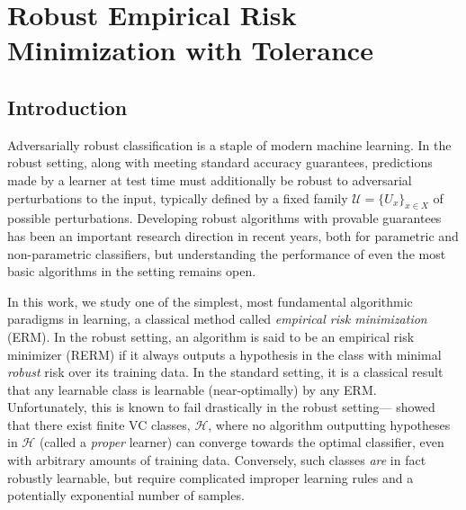 \def\ind{\mathbbm{1}}
\def\oc{Online\_Cluster}
\def\ocns{No\_Sub\_Cluster}
\def\mem{\mathcal M}
\def\E{\mathbb{E}}
\def\R{\mathbb{R}}
\def\OC{\text{OC}}
\def\cH{\mathcal H}
\def\reals{\mathbb{R}}
\def\cD{\mathcal D}
\def\Ev{\mathbb{E}}
\def\cO{\mathcal O}
\def\cX{\mathcal X}
\def\cU{\mathcal U}
\def\cM{\mathcal M}



\chapter{Robust Empirical Risk Minimization with Tolerance} 

\section{Introduction}

Adversarially robust classification is a staple of modern machine learning. In the robust setting, along with meeting standard accuracy guarantees, predictions made by a learner at test time must additionally be robust to adversarial perturbations to the input, typically defined by a fixed family $\mathcal{U}=\{U_x\}_{x \in X}$ of possible perturbations. Developing robust algorithms with provable guarantees has been an important research direction in recent years, both for parametric \cite{loh18, attias19, Srebro19, bartlett19, pathak20} and non-parametric \cite{WJC18, YRWC19, Bhattacharjee20, Bhattacharjee21} classifiers, but understanding the performance of even the most basic algorithms in the setting remains open.

In this work, we study one of the simplest, most fundamental algorithmic paradigms in learning, a classical method called \textit{empirical risk minimization} (ERM). In the robust setting, an algorithm is said to be an empirical risk minimizer (RERM) if it always outputs a hypothesis in the class with minimal \textit{robust} risk over its training data. In the standard setting, it is a classical result that any learnable class is learnable (near-optimally) by any ERM. Unfortunately, this is known to fail drastically in the robust setting---\citet{Srebro19} showed that there exist finite VC classes, $\mathcal{H}$, where no algorithm outputting hypotheses in $\mathcal{H}$ (called a \textit{proper} learner) can converge towards the optimal classifier, even with arbitrary amounts of training data. Conversely, such classes \textit{are} in fact robustly learnable, but require complicated improper learning rules and a potentially exponential number of samples.

